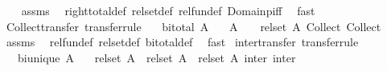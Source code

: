 \begin{isabellebody}
%
\isadelimproof
\ \ %
\endisadelimproof
%
\isatagproof
{}\isamarkupfalse%
\ assms\ \isamarkupfalse%
\ right{\isacharunderscore}{\kern0pt}total{\isacharunderscore}{\kern0pt}def\ rel{\isacharunderscore}{\kern0pt}set{\isacharunderscore}{\kern0pt}def\ rel{\isacharunderscore}{\kern0pt}fun{\isacharunderscore}{\kern0pt}def\ Domainp{\isacharunderscore}{\kern0pt}iff\ \isamarkupfalse%
\ fast%
\endisatagproof
{\isafoldproof}%
%
\isadelimproof
\isanewline
%
\endisadelimproof
\isanewline
{}\isamarkupfalse%
\ Collect{\isacharunderscore}{\kern0pt}transfer\ {\isacharbrackleft}{\kern0pt}transfer{\isacharunderscore}{\kern0pt}rule{\isacharbrackright}{\kern0pt}{\isacharcolon}{\kern0pt}\isanewline
\ \ \ {\isachardoublequoteopen}bi{\isacharunderscore}{\kern0pt}total\ A{\isachardoublequoteclose}\isanewline
\ \ \ {\isachardoublequoteopen}{\isacharparenleft}{\kern0pt}{\isacharparenleft}{\kern0pt}A\ {\isacharequal}{\kern0pt}{\isacharequal}{\kern0pt}{\isacharequal}{\kern0pt}{\isachargreater}{\kern0pt}\ {\isacharparenleft}{\kern0pt}{\isacharequal}{\kern0pt}{\isacharparenright}{\kern0pt}{\isacharparenright}{\kern0pt}\ {\isacharequal}{\kern0pt}{\isacharequal}{\kern0pt}{\isacharequal}{\kern0pt}{\isachargreater}{\kern0pt}\ rel{\isacharunderscore}{\kern0pt}set\ A{\isacharparenright}{\kern0pt}\ Collect\ Collect{\isachardoublequoteclose}\isanewline
%
\isadelimproof
\ \ %
\endisadelimproof
%
\isatagproof
{}\isamarkupfalse%
\ assms\ \isamarkupfalse%
\ rel{\isacharunderscore}{\kern0pt}fun{\isacharunderscore}{\kern0pt}def\ rel{\isacharunderscore}{\kern0pt}set{\isacharunderscore}{\kern0pt}def\ bi{\isacharunderscore}{\kern0pt}total{\isacharunderscore}{\kern0pt}def\ \isamarkupfalse%
\ fast%
\endisatagproof
{\isafoldproof}%
%
\isadelimproof
\isanewline
%
\endisadelimproof
\isanewline
{}\isamarkupfalse%
\ inter{\isacharunderscore}{\kern0pt}transfer\ {\isacharbrackleft}{\kern0pt}transfer{\isacharunderscore}{\kern0pt}rule{\isacharbrackright}{\kern0pt}{\isacharcolon}{\kern0pt}\isanewline
\ \ \ {\isachardoublequoteopen}bi{\isacharunderscore}{\kern0pt}unique\ A{\isachardoublequoteclose}\isanewline
\ \ \ {\isachardoublequoteopen}{\isacharparenleft}{\kern0pt}rel{\isacharunderscore}{\kern0pt}set\ A\ {\isacharequal}{\kern0pt}{\isacharequal}{\kern0pt}{\isacharequal}{\kern0pt}{\isachargreater}{\kern0pt}\ rel{\isacharunderscore}{\kern0pt}set\ A\ {\isacharequal}{\kern0pt}{\isacharequal}{\kern0pt}{\isacharequal}{\kern0pt}{\isachargreater}{\kern0pt}\ rel{\isacharunderscore}{\kern0pt}set\ A{\isacharparenright}{\kern0pt}\ inter\ inter{\isachardoublequoteclose}\isanewline

\end{isabellebody}
